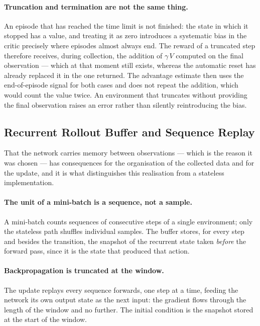 \paragraph{Truncation and termination are not the same thing.}
An episode that has reached the time limit is not finished: the state in which
it stopped has a value, and treating it as zero introduces a systematic bias in
the critic precisely where episodes almost always end. The reward of a truncated
step therefore receives, during collection, the addition of $\gamma\,V$ computed
on the final observation --- which at that moment still exists, whereas the
automatic reset has already replaced it in the one returned. The advantage
estimate then uses the end-of-episode signal for both cases and does not repeat
the addition, which would count the value twice. An environment that truncates
without providing the final observation raises an error rather than silently
reintroducing the bias.

\subsection{Recurrent Rollout Buffer and Sequence Replay}
\label{sec:rl-buffer}

That the network carries memory between observations --- which is the reason it
was chosen --- has consequences for the organisation of the collected data and
for the update, and it is what distinguishes this realisation from a stateless
implementation.

\paragraph{The unit of a mini-batch is a sequence, not a sample.}
A mini-batch counts sequences of consecutive steps of a single environment; only
the stateless path shuffles individual samples. The buffer stores, for every
step and besides the transition, the snapshot of the recurrent state taken
\emph{before} the forward pass, since it is the state that produced that action.

\paragraph{Backpropagation is truncated at the window.}
The update replays every sequence forwards, one step at a time, feeding the
network its own output state as the next input: the gradient flows through the
length of the window and no further. The initial condition is the snapshot
stored at the start of the window.

